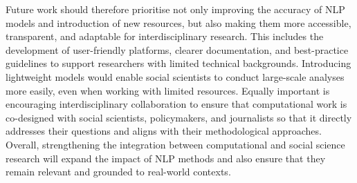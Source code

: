 Future work should therefore prioritise not only improving the accuracy of \ac{NLP} models and introduction of new resources, but also making them more accessible, transparent, and adaptable for interdisciplinary research. This includes the development of user-friendly platforms, clearer documentation, and best-practice guidelines to support researchers with limited technical backgrounds. Introducing lightweight models would enable social scientists to conduct large-scale analyses more easily, even when working with limited resources. Equally important is encouraging interdisciplinary collaboration to ensure that computational work is co-designed with social scientists, policymakers, and journalists so that it directly addresses their questions and aligns with their methodological approaches. Overall, strengthening the integration between computational and social science research will expand the impact of \ac{NLP} methods and also ensure that they remain relevant and grounded to real-world contexts.


